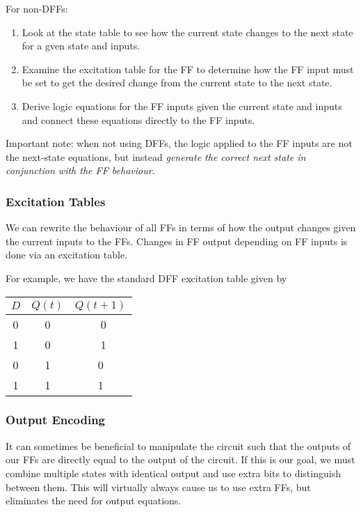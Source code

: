 \documentclass[12pt]{article}
\begin{document}
For non-DFFs:
\begin{enumerate}
\item Look at the state table to see how the current state changes to the next state for a gven state and inputs.
\item Examine the excitation table for the FF to determine how the FF input must be set to get the desired change from the current state to the next state.
\item Derive logic equations for the FF inputs given the current state and inputs and connect these equations directly to the FF inputs.
\end{enumerate}

Important note: when not using DFFs, the logic applied to the FF inputs are not the next-state equations, but instead \emph{generate the correct next state in conjunction with the FF behaviour}.

\subsubsection*{Excitation Tables}
We can rewrite the behaviour of all FFs in terms of how the output changes given the current inputs to the FFs. Changes in FF output depending on FF inputs is done via an excitation table.

For example, we have the standard DFF excitation table given by

\begin{table}[ht]
\centering
\begin{tabular}{c|cc}
  \toprule
  $D$ & $Q(t)$ & $Q(t+1)$ \\
  \midrule
  0 & 0 & 0 \\
  1 & 0 & 1 \\
  0 & 1 & 0 \\
  1 & 1 & 1 \\
\end{tabular}
\end{table}

\subsubsection*{Output Encoding}
It can sometimes be beneficial to manipulate the circuit such that the outputs of our FFs are directly equal to the output of the circuit. If this is our goal, we must combine multiple states with identical output and use extra bits to distinguish between them. This will virtually always cause us to use extra FFs, but eliminates the need for output equations.
\end{document}
